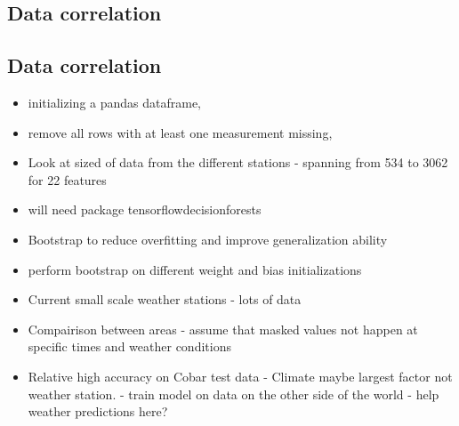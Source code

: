 \documentclass[11pt]{article}
\begin{document}
\subsection{Data correlation} %
\label{sub:Data correlation}

\subsection{Data correlation} %
\label{sub:Data correlation}

\begin{itemize}
    \item initializing a pandas dataframe,
    \item remove all rows with at least one measurement missing,
    \item Look at sized of data from the different stations - spanning from 534 to 3062 for 22 features
    \item will need package tensorflowdecisionforests
    \item Bootstrap to reduce overfitting and improve generalization ability
    \item perform bootstrap on different weight and bias initializations
    \item Current small scale weather stations - lots of data
    \item Compairison between areas - assume that masked values not happen at specific times and weather conditions
    \item Relative high accuracy on Cobar test data - Climate maybe largest factor not weather station.  - train model on data on the other side of the world - help weather predictions here?
\end{itemize}


\newpage
\appendix
\end{document}
